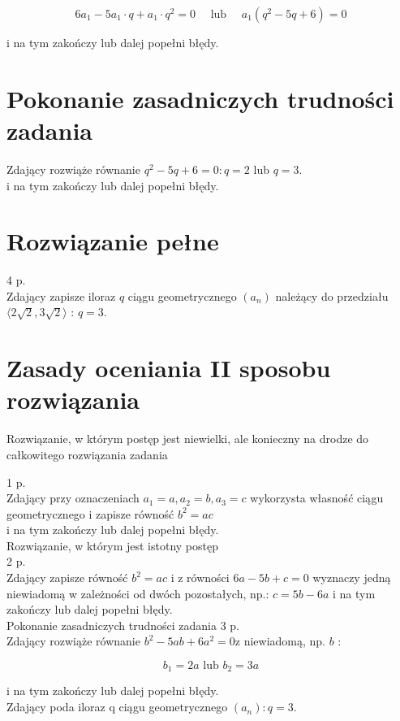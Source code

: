 \documentclass[10pt]{article}
\begin{document}
$$
6 a_{1}-5 a_{1} \cdot q+a_{1} \cdot q^{2}=0 \quad \text { lub } \quad a_{1}\left(q^{2}-5 q+6\right)=0
$$

i na tym zakończy lub dalej popełni błędy.

\section*{Pokonanie zasadniczych trudności zadania}
Zdający rozwiąże równanie $q^{2}-5 q+6=0: q=2$ lub $q=3$.\\
i na tym zakończy lub dalej popełni błędy.

\section*{Rozwiązanie pełne}
4 p.\\
Zdający zapisze iloraz $q$ ciągu geometrycznego $\left(a_{n}\right)$ należący do przedziału $\langle 2 \sqrt{2}, 3 \sqrt{2}\rangle$ : $q=3$.

\section*{Zasady oceniania II sposobu rozwiązania}
Rozwiązanie, w którym postęp jest niewielki, ale konieczny na drodze do całkowitego rozwiązania zadania

1 p.\\
Zdający przy oznaczeniach $a_{1}=a, a_{2}=b, a_{3}=c$ wykorzysta własność ciągu geometrycznego i zapisze równość $b^{2}=a c$\\
i na tym zakończy lub dalej popełni błędy.\\
Rozwiązanie, w którym jest istotny postęp\\
2 p.\\
Zdający zapisze równość $b^{2}=a c$ i z równości $6 a-5 b+c=0$ wyznaczy jedną niewiadomą w zależności od dwóch pozostałych, np.: $c=5 b-6 a$ i na tym zakończy lub dalej popełni błędy.\\
Pokonanie zasadniczych trudności zadania 3 p.\\
Zdający rozwiąże równanie $b^{2}-5 a b+6 a^{2}=0 \mathrm{z}$ niewiadomą, np. $b$ :

$$
b_{1}=2 a \text { lub } b_{2}=3 a
$$

i na tym zakończy lub dalej popełni błędy.\\
$\qquad$\\
Zdający poda iloraz q ciągu geometrycznego $\left(a_{n}\right): q=3$.
\end{document}

